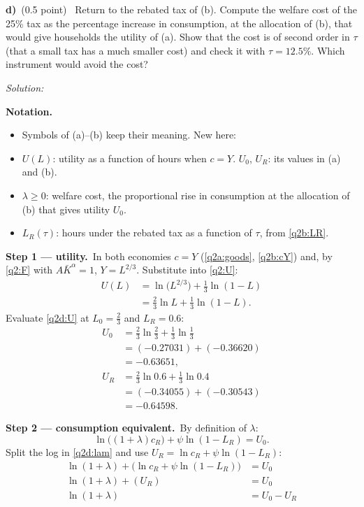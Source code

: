\documentclass[11pt,a4paper]{article}
\newif\ifsolucoes
\newcommand{\espacoresol}{6cm}
\newcommand{\parte}[2]{\par\Needspace{6\baselineskip}\medskip\noindent\textbf{#1)}~(#2)~}
\newcommand{\resolespaco}{\ifsolucoes\else\par\textit{Solution:}\vspace{\espacoresol}\par\fi}
\newcommand{\passo}[2]{\par\smallskip\noindent\textbf{Step #1.}~#2}
\newenvironment{notacao}{\par\smallskip\noindent\textbf{Notation.}\begin{itemize}[leftmargin=1.4em,topsep=1pt,itemsep=0pt]\small}{\end{itemize}}
\begin{document}
\parte{d}{0.5 point} Return to the rebated tax of (b). Compute the welfare cost of the 25\% tax as the
percentage increase in consumption, at the allocation of (b), that would give households the utility of (a).
Show that the cost is of second order in $\tau$ (that a small tax has a much smaller cost) and check it with
$\tau=12.5\%$. Which instrument would avoid the cost?
\resolespaco
\begin{sol}
\begin{notacao}
\item Symbols of (a)--(b) keep their meaning. New here:
\item $U(L)$: utility as a function of hours when $c=Y$. $U_0$, $U_R$: its values in (a) and (b).
\item $\lambda\ge0$: welfare cost, the proportional rise in consumption at the allocation of (b) that gives
utility $U_0$.
\item $L_R(\tau)$: hours under the rebated tax as a function of $\tau$, from \eqref{q2b:LR}.
\end{notacao}
\passo{1 --- utility}{In both economies $c=Y$ (\eqref{q2a:goods}, \eqref{q2b:cY}) and, by \eqref{q2:F} with
$A\bar K^{\alpha}=1$, $Y=L^{2/3}$. Substitute into \eqref{q2:U}:
\begin{align}
U(L) &= \ln\big(L^{2/3}\big)+\tfrac13\ln(1-L)\nonumber\\
&= \tfrac23\ln L+\tfrac13\ln(1-L). \label{q2d:U}
\end{align}
Evaluate \eqref{q2d:U} at $L_0=\tfrac23$ and $L_R=0.6$:
\begin{align*}
U_0 &= \tfrac23\ln\tfrac23+\tfrac13\ln\tfrac13\\
&= (-0.27031)+(-0.36620)\\
&= -0.63651,\\
U_R &= \tfrac23\ln0.6+\tfrac13\ln0.4\\
&= (-0.34055)+(-0.30543)\\
&= -0.64598.
\end{align*}}
\passo{2 --- consumption equivalent}{By definition of $\lambda$:
\begin{equation}
\ln\big((1+\lambda)c_R\big)+\psi\ln(1-L_R)=U_0. \label{q2d:lam}
\end{equation}
Split the log in \eqref{q2d:lam} and use $U_R=\ln c_R+\psi\ln(1-L_R)$:
\begin{align*}
\ln(1+\lambda)+\big(\ln c_R+\psi\ln(1-L_R)\big) &= U_0\\
\ln(1+\lambda)+(U_R) &= U_0\\
\ln(1+\lambda) &= U_0-U_R\\

\end{align*}}
\end{sol}
\end{document}
